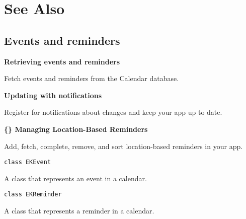 \documentclass{article}
\begin{document}
\section*{See Also}

\subsection*{Events and reminders}
\textbf{Retrieving events and reminders}

Fetch events and reminders from the Calendar database.

\textbf{Updating with notifications}

Register for notifications about changes and keep your app up to date.

\textbf{\{\} Managing Location-Based Reminders}

Add, fetch, complete, remove, and sort location-based reminders in your app.

\texttt{class EKEvent}

A class that represents an event in a calendar.

\texttt{class EKReminder}

A class that represents a reminder in a calendar.

\newpage
\end{document}
